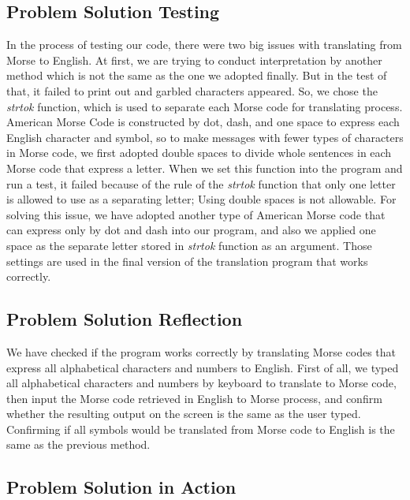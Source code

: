 \documentclass[12pt]{article}
\begin{document}
\subsection{Problem Solution Testing}
In the process of testing our code, there were two big issues with translating from Morse to English. At first, we are trying to conduct interpretation by another method which is not the same as the one we adopted finally. But in the test of that, it failed to print out and garbled characters appeared. So, we chose the \emph{strtok} function, which is used to separate each Morse code for translating process. American Morse Code is constructed by dot, dash, and one space to express each English character and symbol, so to make messages with fewer types of characters in Morse code, we first adopted double spaces to divide whole sentences in each Morse code that express a letter. When we set this function into the program and run a test, it failed because of the rule of the \emph{strtok} function that only one letter is allowed to use as a separating letter; Using double spaces is not allowable. For solving this issue, we have adopted another type of American Morse code that can express only by dot and dash into our program, and also we applied one space as the separate letter stored in \emph{strtok} function as an argument. Those settings are used in the final version of the translation program that works correctly.
\subsection{Problem Solution Reflection}
    We have checked if the program works correctly by translating Morse codes that express all alphabetical characters and numbers to English. First of all, we typed all alphabetical characters and numbers by keyboard to translate to Morse code, then input the Morse code retrieved in English to Morse process, and confirm whether the resulting output on the screen is the same as the user typed. Confirming if all symbols would be translated from Morse code to English is the same as the previous method. 
\subsection{Problem Solution in Action}
\end{document}
